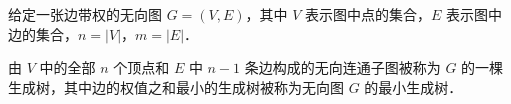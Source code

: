 
给定一张边带权的无向图 $G=(V, E)$，其中 $V$ 表示图中点的集合，$E$ 表示图中边的集合，$n=|V|$，$m=|E|$．

由 $V$ 中的全部 $n$ 个顶点和 $E$ 中 $n-1$ 条边构成的无向连通子图被称为 $G$ 的一棵生成树，其中边的权值之和最小的生成树被称为无向图 $G$ 的最小生成树．
